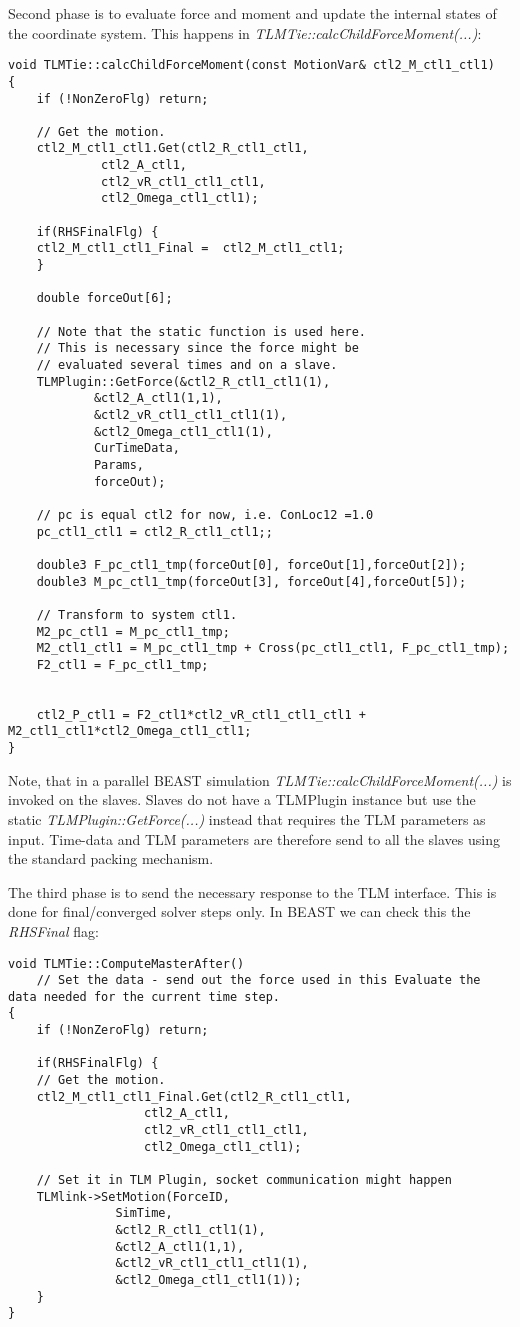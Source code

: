 Second phase is to evaluate force and moment and update the internal
states of the coordinate system. This happens in {\em
  TLMTie::calcChildForceMoment(...)}:


{\scriptsize
\begin{verbatim}
void TLMTie::calcChildForceMoment(const MotionVar& ctl2_M_ctl1_ctl1)
{
    if (!NonZeroFlg) return;

    // Get the motion.
    ctl2_M_ctl1_ctl1.Get(ctl2_R_ctl1_ctl1,
			 ctl2_A_ctl1,
			 ctl2_vR_ctl1_ctl1_ctl1,
			 ctl2_Omega_ctl1_ctl1);

    if(RHSFinalFlg) {
	ctl2_M_ctl1_ctl1_Final =  ctl2_M_ctl1_ctl1;
    }

    double forceOut[6];

    // Note that the static function is used here.
    // This is necessary since the force might be
    // evaluated several times and on a slave.
    TLMPlugin::GetForce(&ctl2_R_ctl1_ctl1(1),
			&ctl2_A_ctl1(1,1),
			&ctl2_vR_ctl1_ctl1_ctl1(1),
			&ctl2_Omega_ctl1_ctl1(1),
			CurTimeData,
			Params,
			forceOut);

    // pc is equal ctl2 for now, i.e. ConLoc12 =1.0
    pc_ctl1_ctl1 = ctl2_R_ctl1_ctl1;;

    double3 F_pc_ctl1_tmp(forceOut[0], forceOut[1],forceOut[2]);
    double3 M_pc_ctl1_tmp(forceOut[3], forceOut[4],forceOut[5]);

    // Transform to system ctl1.
    M2_pc_ctl1 = M_pc_ctl1_tmp;
    M2_ctl1_ctl1 = M_pc_ctl1_tmp + Cross(pc_ctl1_ctl1, F_pc_ctl1_tmp);
    F2_ctl1 = F_pc_ctl1_tmp;


    ctl2_P_ctl1 = F2_ctl1*ctl2_vR_ctl1_ctl1_ctl1 + M2_ctl1_ctl1*ctl2_Omega_ctl1_ctl1;
}
\end{verbatim}
}

Note, that in a parallel BEAST simulation {\em
  TLMTie::calcChildForceMoment(...)} is invoked on the slaves. Slaves
do not have a TLMPlugin instance but use the static {\em
  TLMPlugin::GetForce(...)}  instead that requires the TLM parameters
as input. Time-data and TLM parameters are therefore send to all the
slaves using the standard packing mechanism.


The third phase is to send the necessary response to the TLM
interface. This is done for final/converged solver steps only. In
BEAST we can check this the {\em RHSFinal} flag:

{\scriptsize
\begin{verbatim}
void TLMTie::ComputeMasterAfter()
    // Set the data - send out the force used in this Evaluate the data needed for the current time step.
{
    if (!NonZeroFlg) return;

    if(RHSFinalFlg) {
	// Get the motion.
	ctl2_M_ctl1_ctl1_Final.Get(ctl2_R_ctl1_ctl1,
				   ctl2_A_ctl1,
				   ctl2_vR_ctl1_ctl1_ctl1,
				   ctl2_Omega_ctl1_ctl1);

	// Set it in TLM Plugin, socket communication might happen
	TLMlink->SetMotion(ForceID,
			   SimTime,
			   &ctl2_R_ctl1_ctl1(1),
			   &ctl2_A_ctl1(1,1),
			   &ctl2_vR_ctl1_ctl1_ctl1(1),
			   &ctl2_Omega_ctl1_ctl1(1));
    }
}
\end{verbatim}
}


